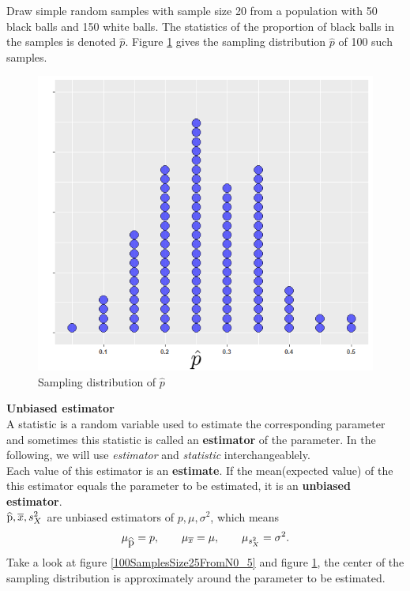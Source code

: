 \documentclass[a4paper, 12pt,twoside]{book}
\newcommand\reallywidehat[1]{%
\savestack{\tmpbox}{\stretchto{%
  \scaleto{%
    \scalerel*[\widthof{\ensuremath{#1}}]{\kern-.6pt\bigwedge\kern-.6pt}%
    {\rule[-\textheight/2]{1ex}{\textheight}}%
  }{\textheight}%
}{0.5ex}}%
\stackon[1pt]{#1}{\tmpbox}%
}
\begin{document}
    \noindent Draw simple random samples with sample size 20 from a population with 50 black balls and 150 white balls. The statistics of the proportion of black balls in the samples is denoted $\hat{p}$. Figure \ref{SamplingDsitributionPHat} gives the sampling distribution $\hat{p}$ of 100 such samples.
      \begin{figure}[H]
         \centering
         \includegraphics[scale=0.4]{SamplingDsitributionPHat}
         \caption{Sampling distribution of $\hat{p}$}
         \label{SamplingDsitributionPHat}
     \end{figure} 
     \newpage
  \noindent \textbf{Unbiased estimator}\vspace{0.3cm}\\
  A statistic is a random variable used to estimate the corresponding parameter and sometimes this statistic is called an \textbf{estimator} of the parameter. In the following, we will use \textit{estimator} and \textit{statistic} interchangeablely.\vspace{0.3cm}\\
  \noindent Each value of this estimator is an \textbf{estimate}. If the mean(expected value) of the this estimator equals the parameter to be estimated, it is an \textbf{unbiased estimator}.\vspace{0.3cm}\\
  $\reallywidehat{p}, \overline{x}, s_X^2$ are unbiased estimators of $p, \mu, \sigma^2$, which means 
  $$\mu_{\reallywidehat{p}} = p, \qquad
  \mu_{\overline{x}} = \mu, \qquad
  \mu_{s_X^2} = \sigma^2.$$
  Take a look at figure \ref{100SamplesSize25FromN0_5} and figure \ref{SamplingDsitributionPHat}, the center of the sampling distribution is approximately around the parameter to be estimated.\vspace{0.5cm}\\
  
\end{document}
